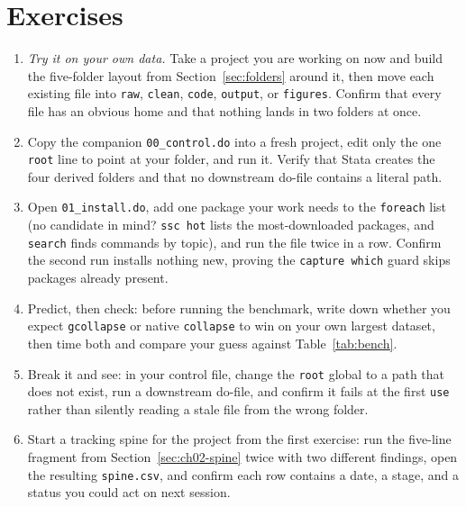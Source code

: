 \section*{Exercises}
\begin{enumerate}
\item \emph{Try it on your own data.} Take a project you are working on now and build the five-folder layout from Section~\ref{sec:folders} around it, then move each existing file into \texttt{raw}, \texttt{clean}, \texttt{code}, \texttt{output}, or \texttt{figures}. Confirm that every file has an obvious home and that nothing lands in two folders at once.
\item Copy the companion \texttt{00\_control.do} into a fresh project, edit only the one \texttt{root} line to point at your folder, and run it. Verify that Stata creates the four derived folders and that no downstream do-file contains a literal path.
\item Open \texttt{01\_install.do}, add one package your work needs to the \texttt{foreach} list (no candidate in mind? \texttt{ssc hot} lists the most-downloaded packages, and \texttt{search} finds commands by topic), and run the file twice in a row. Confirm the second run installs nothing new, proving the \texttt{capture which} guard skips packages already present.
\item Predict, then check: before running the benchmark, write down whether you expect \texttt{gcollapse} or native \texttt{collapse} to win on your own largest dataset, then time both and compare your guess against Table~\ref{tab:bench}.
\item Break it and see: in your control file, change the \texttt{root} global to a path that does not exist, run a downstream do-file, and confirm it fails at the first \texttt{use} rather than silently reading a stale file from the wrong folder.
\item Start a tracking spine for the project from the first exercise: run the five-line fragment from Section~\ref{sec:ch02-spine} twice with two different findings, open the resulting \texttt{spine.csv}, and confirm each row contains a date, a stage, and a status you could act on next session.
\end{enumerate}
